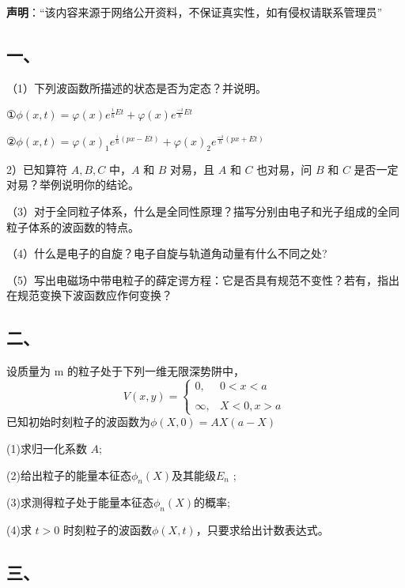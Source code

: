 
\textbf{声明}：“该内容来源于网络公开资料，不保证真实性，如有侵权请联系管理员”

\subsection{一、}
（1）下列波函数所描述的状态是否为定态？并说明。

①$\phi(x,t)=\varphi(x)e^{\frac{i}{\hbar}Et}+\varphi(x)e^{\frac{-i}{\hbar}Et}$

②$\phi(x,t)=\varphi(x)_1e^{\frac{i}{\hbar}(px-Et)}+\varphi(x)_2e^{\frac{-i}{\hbar}(px+Et)}$

2）已知算符 $A,B,C$ 中，$A$ 和 $B$ 对易，且 $A$ 和 $C$ 也对易，问 $B$ 和 $C$ 是否一定对易？举例说明你的结论。

（3）对于全同粒子体系，什么是全同性原理？描写分别由电子和光子组成的全同粒子体系的波函数的特点。

（4）什么是电子的自旋？电子自旋与轨道角动量有什么不同之处?

（5）写出电磁场中带电粒子的薛定谔方程：它是否具有规范不变性？若有，指出在规范变换下波函数应作何变换？
\subsection{二、}
设质量为 m 的粒子处于下列一维无限深势阱中，
$$V(x,y)=\begin{cases}
0,&0 < x <a \\\\
\infty ,& X < 0,  x>a 
\end{cases}~
$$
已知初始时刻粒子的波函数为$\phi(X,0)=AX(a-X)$

(1)求归一化系数 $A$;

(2)给出粒子的能量本征态$\phi_n(X)$及其能级$E_n$ ;

(3)求测得粒子处于能量本征态$\phi_n(X)$的概率;

(4)求 $t>0$ 时刻粒子的波函数$\phi(X,t)$，只要求给出计数表达式。
\subsection{三、}
